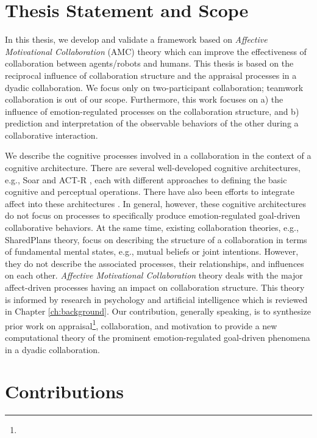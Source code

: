 \documentclass[12pt]{report}
\begin{document}
\section{Thesis Statement and Scope}

In this thesis, we develop and validate a framework based on \textit{Affective
Motivational Collaboration} (AMC) theory which can improve the effectiveness of
collaboration between agents/robots and humans. This thesis is based on the
reciprocal influence of collaboration structure and the appraisal processes in a
dyadic collaboration. We focus only on two-participant collaboration; teamwork
collaboration is out of our scope. Furthermore, this work focuses on a) the
influence of emotion-regulated processes on the collaboration structure, and b)
prediction and interpretation of the observable behaviors of the other during a
collaborative interaction.

We describe the cognitive processes involved in a collaboration in the context
of a cognitive architecture. There are several well-developed cognitive
architectures, e.g., Soar \cite{laird:soar} and ACT-R \cite{anderson:act-r},
each with different approaches to defining the basic cognitive and perceptual
operations. There have also been efforts to integrate affect into these
architectures \cite{dancy:actR-physiology-affect, marinier:behavior-emotion}. In
general, however, these cognitive architectures do not focus on processes to
specifically produce emotion-regulated goal-driven collaborative behaviors. At
the same time, existing collaboration theories, e.g., SharedPlans
\cite{grosz:plans-discourse} theory, focus on describing the structure of a
collaboration in terms of fundamental mental states, e.g., mutual beliefs or
joint intentions. However, they do not describe the associated processes, their
relationships, and influences on each other. \textit{Affective Motivational
Collaboration} theory deals with the major affect-driven processes having an
impact on collaboration structure. This theory is informed by research in
psychology and artificial intelligence which is reviewed in Chapter
\ref{ch:background}. Our contribution, generally speaking, is to synthesize
prior work on appraisal\footnote{\color{red}{We have chosen appraisal-based
modeling of emotions among several theories of emotions.}}, collaboration, and
motivation to provide a new computational theory of the prominent emotion-regulated
goal-driven phenomena in a dyadic collaboration.

\section{Contributions}
\end{document}

